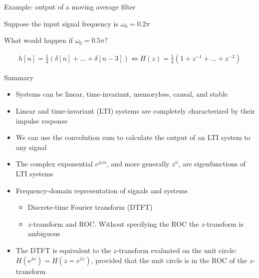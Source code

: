 \documentclass[10pt, aspectratio=169]{beamer}
\begin{document}
\begin{frame}{Example: output of a moving average filter}

 {Suppose the input signal frequency is $\omega_0 = 0.2\pi$}

 {What would happen if $\omega_0 = 0.5\pi$?}

\begin{center}
	\resizebox{0.95\linewidth}{!}{}
\end{center}
\begin{align*}
h[n] = \frac{1}{4}(\delta[n] + \ldots + \delta[n-3]) \Longleftrightarrow H(z) = \frac{1}{4}(1 + z^{-1} + \ldots + z^{-3})
\end{align*}

\end{frame}

%	
%

\begin{frame}{Summary}

\begin{itemize}
	\item Systems can be linear, time-invariant, memoryless, causal, and stable
	\item Linear and time-invariant (LTI) systems are completely characterized by their impulse response
	\item We can use the convolution sum to calculate the output of an LTI system to any signal 
	\item The complex exponential $e^{j\omega n}$, and more generally $z^n$, are eigenfunctions of LTI systems
	\item Frequency-domain representation of signals and systems
	\begin{itemize}\normalsize
		\item Discrete-time Fourier transform (DTFT)
		\item $z$-transform and ROC. Without specifying the ROC the $z$-transform is ambiguous
	\end{itemize}
	\item The DTFT is equivalent to the $z$-transform evaluated on the unit circle: $H(e^{j\omega}) = H(z = e^{j\omega})$, provided that the unit circle is in the ROC of the $z$-transform
\end{itemize}

\end{frame}
\end{document}

